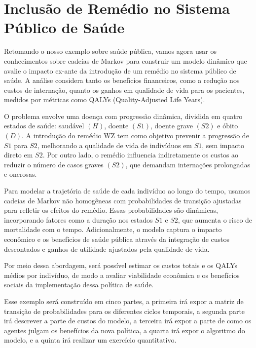 \documentclass[12pt, a4paper, openany]{book}
\numberwithin{equation}{chapter}
\numberwithin{table}{chapter}
\numberwithin{figure}{chapter}
\theoremstyle{break}
\begin{document}
\section[Inclusão de Remédio no Sistema Público de Saúde]{Inclusão de Remédio no Sistema Público de Saúde\protect\footnotemark}


Retomando o nosso exemplo sobre saúde pública, vamos agora usar os conhecimentos sobre cadeias de Markov para construir um modelo dinâmico que avalie o impacto ex-ante da introdução de um remédio no sistema público de saúde. A análise considera tanto os benefícios financeiros, como a redução nos custos de internação, quanto os ganhos em qualidade de vida para os pacientes, medidos por métricas como QALYs (Quality-Adjusted Life Years).

O problema envolve uma doença com progressão dinâmica, dividida em quatro estados de saúde: saudável $(H)$, doente $(S1)$, doente grave $(S2)$ e óbito $(D)$. A introdução do remédio WZ tem como objetivo prevenir a progressão de  $S1$ para  $S2$, melhorando a qualidade de vida de indivíduos em  $S1$, sem impacto direto em  $S2$. Por outro lado, o remédio influencia indiretamente os custos ao reduzir o número de casos graves $(S2)$, que demandam internações prolongadas e onerosas.

Para modelar a trajetória de saúde de cada indivíduo ao longo do tempo, usamos cadeias de Markov não homogêneas com probabilidades de transição ajustadas para refletir os efeitos do remédio. Essas probabilidades são dinâmicas, incorporando fatores como a duração nos estados 
$S1$ e $S2$, que aumenta o risco de mortalidade com o tempo. Adicionalmente, o modelo captura o impacto econômico e os benefícios de saúde pública através da integração de custos descontados e ganhos de utilidade ajustados pela qualidade de vida.

Por meio dessa abordagem, será possível estimar os custos totais e os QALYs médios por indivíduo, de modo a avaliar viabilidade econômica e os benefícios sociais da implementação dessa política de saúde.

Esse exemplo será construído em cinco partes, a primeira irá expor a matriz de transição de probabilidades para os diferentes ciclos temporais, a segunda parte irá descrever a parte de custos do modelo, a terceira irá expor a parte de como os agentes julgam os benefícios da nova política, a quarta irá expor o algoritmo do modelo, e a quinta irá realizar um exercício quantitativo.
\end{document}
